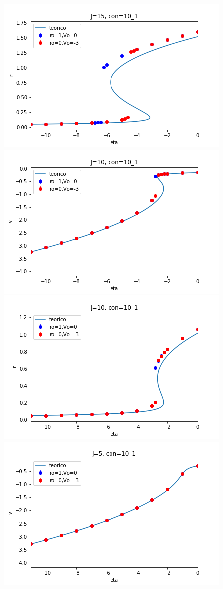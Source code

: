 \documentclass[a4paper]{article}
\begin{document}
\includegraphics[scale=0.7]{r_vs_eta_J15_mod10_1.png}\\
\includegraphics[scale=0.7]{v_vs_eta_J10_mod10_1.png}\\
\includegraphics[scale=0.7]{r_vs_eta_J10_mod10_1.png}\\
\includegraphics[scale=0.7]{v_vs_eta_J5_mod10_1.png}\\
\end{document}
